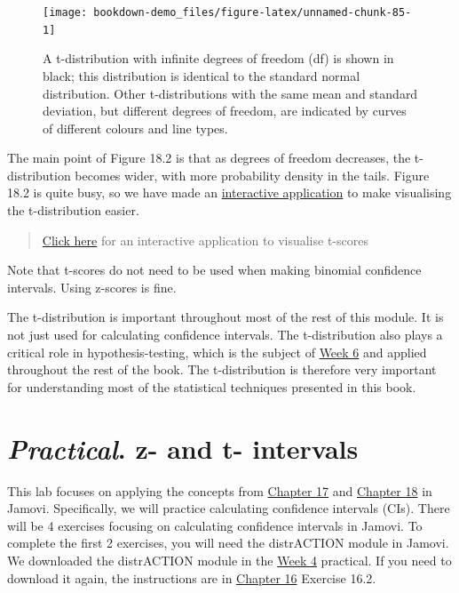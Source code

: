 \documentclass[
]{scrbook}
\begin{document}
\begin{figure}
\texttt{[image: bookdown-demo\_files/figure-latex/unnamed-chunk-85-1]} \caption{A t-distribution with infinite degrees of freedom (df) is shown in black; this distribution is identical to the standard normal distribution. Other t-distributions with the same mean and standard deviation, but different degrees of freedom, are indicated by curves of different colours and line types.}\label{fig:unnamed-chunk-85}
\end{figure}

The main point of Figure 18.2 is that as degrees of freedom decreases, the t-distribution becomes wider, with more probability density in the tails.
Figure 18.2 is quite busy, so we have made an \href{https://bradduthie.shinyapps.io/t_score/}{interactive application} to make visualising the t-distribution easier.

\begin{quote}
\href{https://bradduthie.shinyapps.io/t_score/}{Click here} for an interactive application to visualise t-scores
\end{quote}

Note that t-scores do not need to be used when making binomial confidence intervals.
Using z-scores is fine.

The t-distribution is important throughout most of the rest of this module.
It is not just used for calculating confidence intervals.
The t-distribution also plays a critical role in hypothesis-testing, which is the subject of \protect\hyperlink{Week_6}{Week 6} and applied throughout the rest of the book.
The t-distribution is therefore very important for understanding most of the statistical techniques presented in this book.

\hypertarget{practical.-z--and-t--intervals}{%
\chapter{\texorpdfstring{\emph{Practical}. z- and t- intervals}{Practical. z- and t- intervals}}\label{practical.-z--and-t--intervals}}

This lab focuses on applying the concepts from \protect\hyperlink{Chapter_17}{Chapter 17} and \protect\hyperlink{Chapter_18}{Chapter 18} in Jamovi.
Specifically, we will practice calculating confidence intervals (CIs).
There will be 4 exercises focusing on calculating confidence intervals in Jamovi.
To complete the first 2 exercises, you will need the distrACTION module in Jamovi.
We downloaded the distrACTION module in the \protect\hyperlink{Week_4}{Week 4} practical.
If you need to download it again, the instructions are in \protect\hyperlink{Chapter_16}{Chapter 16} Exercise 16.2.
\end{document}
